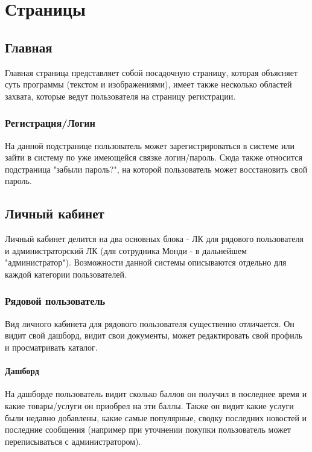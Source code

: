 \documentclass[DIV=calc, paper=a4, fontsize=11pt]{scrartcl} %
\begin{document}

\section{Страницы}

\subsection{Главная}

Главная страница представляет собой посадочную страницу, которая объясняет суть программы (текстом и изображениями), имеет также несколько областей захвата, которые ведут пользователя на страницу регистрации.

\subsubsection{Регистрация/Логин}
На данной подстранице пользователь может зарегистрироваться в системе или зайти в систему по уже имеющейся связке логин/пароль. Сюда также относится подстраница "забыли пароль?", на которой пользователь может восстановить свой пароль.

\subsection{Личный кабинет}

Личный кабинет делится на два основных блока - ЛК для рядового пользователя и администраторский ЛК (для сотрудника Монди - в дальнейшем "администратор"). Возможности данной системы описываются отдельно для каждой категории пользователей.


\subsubsection{Рядовой пользователь}

Вид личного кабинета для рядового пользователя существенно отличается. Он видит свой дашборд, видит свои документы, может редактировать свой профиль и просматривать каталог.


\paragraph{Дашборд}

На дашборде пользователь видит сколько баллов он получил в последнее время и какие товары/услуги он приобрел на эти баллы. Также он видит какие услуги были недавно добавлены, какие самые популярные, сводку последних новостей и последние сообщения (например при уточнении покупки пользователь может переписываться с администратором).
\end{document}
